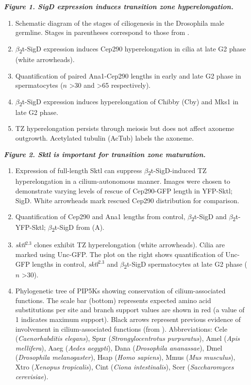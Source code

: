 \documentclass[12pt, twoside, letterpaper]{article}
\newcommand{\sigd}{$\beta$\textsubscript{2}t-SigD}
\begin{document}
\begin{doublespacing}
\begin{linenumbers}
    \textbf{\itshape Figure 1. SigD expression induces transition zone hyperelongation.}
    \begin{enumerate}[label={(\Alph*)}, nolistsep]
    \item Schematic diagram of the stages of ciliogenesis in the Drosophila male germline.
      Stages in parentheses correspond to those from \citep{cenci1994chromatin}.
    \item \sigd{} expression induces Cep290 hyperelongation in cilia at late G2 phase (white arrowheads).
    \item Quantification of paired Ana1-Cep290 lengths in early and late G2 phase in spermatocytes ($n$ >30 and >65 respectively).
    \item \sigd{} expression induces hyperelongation of Chibby (Cby) and Mks1 in late G2 phase.
    \item TZ hyperelongation persists through meiosis but does not affect
      axoneme outgrowth. Acetylated tubulin (AcTub) labels the axoneme.
    \end{enumerate}
    \bigskip
    \textbf{\itshape Figure 2. Sktl is important for transition zone maturation.}
    \begin{enumerate}[label={(\Alph*)}, nolistsep]
    \item Expression of full-length Sktl can suppress \sigd{}-induced TZ hyperelongation in a cilium-autonomous manner.
      Images were chosen to demonstrate varying levels of rescue of Cep290-GFP length in YFP-Sktl; SigD.
      White arrowheads mark rescued Cep290 distribution for comparison.
    \item Quantification of Cep290 and Ana1 lengths from control, \sigd{} and $\beta$\textsubscript{2}t-YFP-Sktl; \sigd{} from (A).
    \item \textit{sktl}$^{2.3}$ clones exhibit TZ hyperelongation (white arrowheads). Cilia are marked using
      Unc-GFP. The plot on the right shows quantification of Unc-GFP lengths in control, \textit{sktl}$^{2.3}$ and \sigd{}
      spermatocytes at late G2 phase ($n$ >30).
    \item Phylogenetic tree of PIP5Ks showing conservation of cilium-associated functions.
      The scale bar (bottom) represents expected amino acid substitutions per site and branch support values are shown in red (a value of 1 indicates maximum support).
      Black arrows represent previous evidence of involvement in cilium-associated functions (from \citep{xu2016phosphatidylinositol}).
      Abbreviations: Cele (\textit{Caenorhabditis elegans}), Spur (\textit{Strongylocentrotus purpuratus}), Amel (\textit{Apis mellifera}), Aaeg (\textit{Aedes aegypti}), Dana (\textit{Drosophila ananassae}), Dmel (\textit{Drosophila melanogaster}), Hsap (\textit{Homo sapiens}), Mmus (\textit{Mus musculus}), Xtro (\textit{Xenopus tropicalis}), Cint (\textit{Ciona intestinalis}), Scer (\textit{Saccharomyces cerevisiae}).

\end{enumerate}
\end{linenumbers}
\end{doublespacing}
\end{document}
